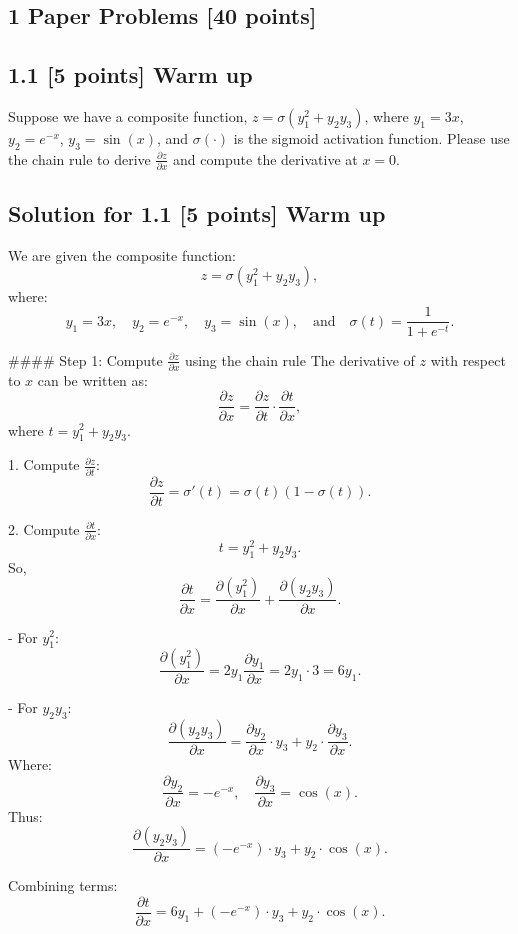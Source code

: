 \documentclass[12pt, fullpage,letterpaper]{article}
\begin{document}
\begin{enumerate}
\section*{1 Paper Problems [40 points]}
\subsection*{1.1 [5 points] Warm up}
Suppose we have a composite function, $z = \sigma(y_1^2 + y_2y_3)$, where $y_1 = 3x$, $y_2 = e^{-x}$, $y_3 = \sin(x)$, and $\sigma(\cdot)$ is the sigmoid activation function. Please use the chain rule to derive $\frac{\partial z}{\partial x}$ and compute the derivative at $x = 0$.

\subsection*{Solution for 1.1 [5 points] Warm up}

We are given the composite function:
\[
z = \sigma(y_1^2 + y_2 y_3),
\]
where:
\[
y_1 = 3x, \quad y_2 = e^{-x}, \quad y_3 = \sin(x), \quad \text{and} \quad \sigma(t) = \frac{1}{1 + e^{-t}}.
\]

#### Step 1: Compute \(\frac{\partial z}{\partial x}\) using the chain rule
The derivative of \(z\) with respect to \(x\) can be written as:
\[
\frac{\partial z}{\partial x} = \frac{\partial z}{\partial t} \cdot \frac{\partial t}{\partial x},
\]
where \(t = y_1^2 + y_2 y_3\).

1. Compute \(\frac{\partial z}{\partial t}\):
\[
\frac{\partial z}{\partial t} = \sigma'(t) = \sigma(t)(1 - \sigma(t)).
\]

2. Compute \(\frac{\partial t}{\partial x}\):
\[
t = y_1^2 + y_2 y_3.
\]
So,
\[
\frac{\partial t}{\partial x} = \frac{\partial (y_1^2)}{\partial x} + \frac{\partial (y_2 y_3)}{\partial x}.
\]

- For \(y_1^2\):
\[
\frac{\partial (y_1^2)}{\partial x} = 2y_1 \frac{\partial y_1}{\partial x} = 2y_1 \cdot 3 = 6y_1.
\]

- For \(y_2 y_3\):
\[
\frac{\partial (y_2 y_3)}{\partial x} = \frac{\partial y_2}{\partial x} \cdot y_3 + y_2 \cdot \frac{\partial y_3}{\partial x}.
\]
Where:
\[
\frac{\partial y_2}{\partial x} = -e^{-x}, \quad \frac{\partial y_3}{\partial x} = \cos(x).
\]
Thus:
\[
\frac{\partial (y_2 y_3)}{\partial x} = (-e^{-x}) \cdot y_3 + y_2 \cdot \cos(x).
\]

Combining terms:
\[
\frac{\partial t}{\partial x} = 6y_1 + (-e^{-x}) \cdot y_3 + y_2 \cdot \cos(x).
\]


\end{enumerate}
\end{document}
